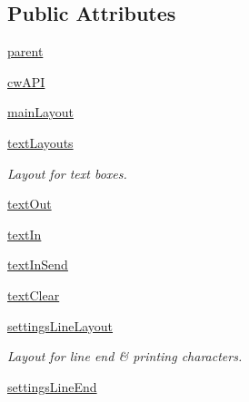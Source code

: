 \subsection*{Public Attributes}
\begin{DoxyCompactItemize}
\item 
\hyperlink{classsoftware_1_1chipwhisperer_1_1capture_1_1utils_1_1SerialTerminalDialog_1_1SerialTerminalDialog_a8ced666bf19c9e5ffe932e0f282b862c}{parent}
\item 
\hyperlink{classsoftware_1_1chipwhisperer_1_1capture_1_1utils_1_1SerialTerminalDialog_1_1SerialTerminalDialog_a2b490843a6325ac6bb25cb43238aa2ac}{cw\+A\+P\+I}
\item 
\hyperlink{classsoftware_1_1chipwhisperer_1_1capture_1_1utils_1_1SerialTerminalDialog_1_1SerialTerminalDialog_a34e2bc7e9f3c04fb75bbe21212d91bcc}{main\+Layout}
\item 
\hyperlink{classsoftware_1_1chipwhisperer_1_1capture_1_1utils_1_1SerialTerminalDialog_1_1SerialTerminalDialog_aa8c739ae1085d049851e7d3876518a6f}{text\+Layouts}
\begin{DoxyCompactList}\small\item\em Layout for text boxes. \end{DoxyCompactList}\item 
\hyperlink{classsoftware_1_1chipwhisperer_1_1capture_1_1utils_1_1SerialTerminalDialog_1_1SerialTerminalDialog_a5e90a4524b680cfc7e6d53b878e5e15a}{text\+Out}
\item 
\hyperlink{classsoftware_1_1chipwhisperer_1_1capture_1_1utils_1_1SerialTerminalDialog_1_1SerialTerminalDialog_a4ebec418cfdef68115285495e77a0e2b}{text\+In}
\item 
\hyperlink{classsoftware_1_1chipwhisperer_1_1capture_1_1utils_1_1SerialTerminalDialog_1_1SerialTerminalDialog_a5563dd1c3242f3ca0ccc11ba9f3cf73a}{text\+In\+Send}
\item 
\hyperlink{classsoftware_1_1chipwhisperer_1_1capture_1_1utils_1_1SerialTerminalDialog_1_1SerialTerminalDialog_a3184bbb3beadd95fbecb26ff2ca2d5df}{text\+Clear}
\item 
\hyperlink{classsoftware_1_1chipwhisperer_1_1capture_1_1utils_1_1SerialTerminalDialog_1_1SerialTerminalDialog_a3795a575e7f6f52b3e11ba7026a8ffed}{settings\+Line\+Layout}
\begin{DoxyCompactList}\small\item\em Layout for line end \& printing characters. \end{DoxyCompactList}\item 
\hyperlink{classsoftware_1_1chipwhisperer_1_1capture_1_1utils_1_1SerialTerminalDialog_1_1SerialTerminalDialog_ac89cc24fe19758a88391c782b674482b}{settings\+Line\+End}

\end{DoxyCompactItemize}
